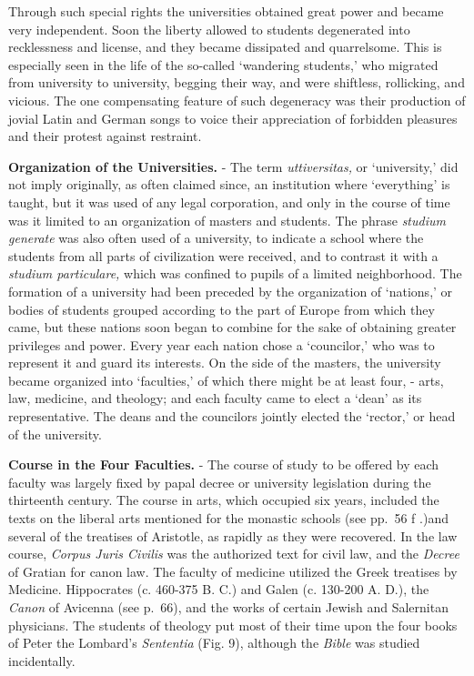 \documentclass[]{book}
\begin{document}
Through such special rights the universities obtained great power and became very independent. Soon the liberty allowed to students degenerated into recklessness and license, and they became dissipated and quarrelsome. This is especially seen in the life of the so-called `wandering students,' who migrated from university to university, begging their way, and were shiftless, rollicking, and vicious. The one compensating feature of such degeneracy was their production of jovial Latin and German songs to voice their appreciation of forbidden pleasures and their protest against restraint.

\textbf{Organization of the Universities.} - The term \emph{uttiversitas,} or `university,' did not imply originally, as often claimed since, an institution where `everything' is taught, but it was used of any legal corporation, and only in the course of time was it limited to an organization of masters and students. The phrase \emph{studium generate} was also often used of a university, to indicate a school where the students from all parts of civilization were received, and to contrast it with a \emph{studium particulare,} which was confined to pupils of a limited neighborhood. The formation of a university had been preceded by the organization of `nations,' or bodies of students grouped according to the part of Europe from which they came, but these nations soon began to combine for the sake of obtaining greater privileges and power. Every year each nation chose a `councilor,' who was to represent it and guard its interests. On the side of the masters, the university became organized into `faculties,' of which there might be at least four, - arts, law, medicine, and theology; and each faculty came to elect a `dean' as its representative. The deans and the councilors jointly elected the `rector,' or head of the university.

\textbf{Course in the Four Faculties.} - The course of study to be offered by each faculty was largely fixed by papal decree or university legislation during the thirteenth century. The course in arts, which occupied six years, included the texts on the liberal arts mentioned for the monastic schools (see pp.~56 f .)and several of the treatises of Aristotle, as rapidly as they were recovered. In the law course, \emph{Corpus Juris Civilis} was the authorized text for civil law, and the \emph{Decree} of Gratian for canon law. The faculty of medicine utilized the Greek treatises by Medicine. Hippocrates (c. 460-375 B. C.) and Galen (c. 130-200 A. D.), the \emph{Canon} of Avicenna (see p.~66), and the works of certain Jewish and Salernitan physicians. The students of theology put most of their time upon the four books of Peter the Lombard's \emph{Sententia} (Fig. 9), although the \emph{Bible} was studied incidentally.
\end{document}
